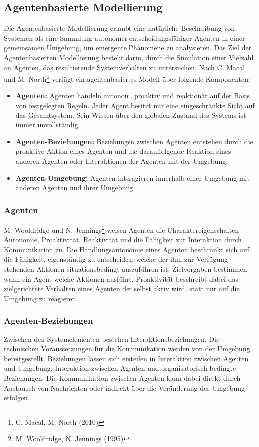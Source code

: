 \documentclass[a4paper, 11pt]{article}
\begin{document}
\subsection{Agentenbasierte Modellierung}
Die Agentenbasierte Modellierung erlaubt eine natürliche Beschreibung von Systemen als eine Sammlung autonomer entscheidungsfähiger Agenten in einer gemeinsamen Umgebung, um emergente Phänomene zu analysieren. Das Ziel der Agentenbasierten Modellierung besteht darin, durch die Simulation einer Vielzahl an Agenten, das resultierende Systemverhalten zu untersuchen. Nach C. Macal und M. North\footnote{C. Macal, M. North (2010)} verfügt ein agentenbasiertes Modell über folgende Komponenten:
\begin{itemize}
	\item \textbf{Agenten:} Agenten handeln autonom, proaktiv und reaktionär auf der Basis von festgelegten Regeln. Jeder Agent besitzt nur eine eingeschränkte Sicht auf das Gesamtsystem. Sein Wissen über den globalen Zustand des Systems ist immer unvollständig.
	\item \textbf{Agenten-Beziehungen:} Beziehungen zwischen Agenten entstehen durch die proaktive Aktion eines Agenten und die darauffolgende Reaktion eines anderen Agenten oder Interaktionen der Agenten mit der Umgebung.
	\item \textbf{Agenten-Umgebung:} Agenten interagieren innerhalb einer Umgebung mit anderen Agenten und ihrer Umgebung.
\end{itemize}
\subsubsection{Agenten} 
M. Wooldridge und N. Jennings\footnote{M. Wooldridge, N. Jennings (1995)} weisen Agenten die Charaktereigenschaften Autonomie, Proaktivität, Reaktivität und die Fähigkeit zur Interaktion durch Kommunikation zu. Die Handlungsautonomie eines Agenten beschränkt sich auf die Fähigkeit, eigenständig zu entscheiden, welche der ihm zur Verfügung stehenden Aktionen situationsbedingt auszuführen ist. Zielvorgaben bestimmen wann ein Agent welche Aktionen ausführt. Proaktivität beschreibt dabei das zielgerichtete Verhalten eines Agenten der selbst aktiv wird, statt nur auf die Umgebung zu reagieren.\newline
\subsubsection{Agenten-Beziehungen}
Zwischen den Systemelementen bestehen Interaktionsbeziehungen. Die technischen Voraussetzungen für die Kommunikation werden von der Umgebung bereitgestellt. Beziehungen lassen sich einteilen in Interaktion zwischen Agenten und Umgebung, Interaktion zwischen Agenten und organisatorisch bedingte Beziehungen. Die Kommunikation zwischen Agenten kann dabei direkt durch Austausch von Nachrichten oder indirekt über die Veränderung der Umgebung erfolgen.\newline
\end{document}
